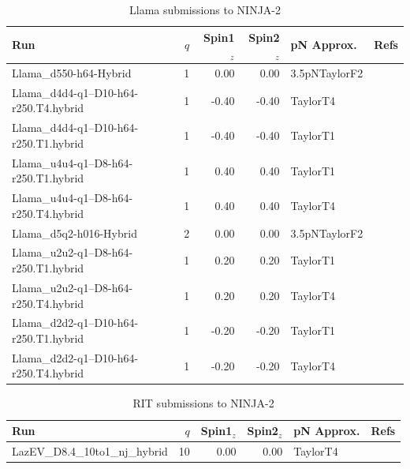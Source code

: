 \begin{table}
\begin{center}
\begin{tabular}{|l|r|r|r|l|c|}
\hline
Run & $q$ & Spin1${}_z$ & Spin2${}_z$ & pN Approx. & Refs \\
\hline
Llama\_d550-h64-Hybrid & 1 & 0.00 & 0.00 & 3.5pNTaylorF2 & \cite{Reisswig:2009rx,Reisswig:2009rx} \\
Llama\_d4d4-q1--D10-h64-r250.T4.hybrid & 1 & -0.40 & -0.40 & TaylorT4 & \cite{Pollney:2010hs,Pollney:2009yz} \\
Llama\_d4d4-q1--D10-h64-r250.T1.hybrid & 1 & -0.40 & -0.40 & TaylorT1 & \cite{Pollney:2010hs,Pollney:2009yz} \\
Llama\_u4u4-q1--D8-h64-r250.T1.hybrid & 1 & 0.40 & 0.40 & TaylorT1 & \cite{Pollney:2010hs,Pollney:2009yz} \\
Llama\_u4u4-q1--D8-h64-r250.T4.hybrid & 1 & 0.40 & 0.40 & TaylorT4 & \cite{Pollney:2010hs,Pollney:2009yz} \\
Llama\_d5q2-h016-Hybrid & 2 & 0.00 & 0.00 & 3.5pNTaylorF2 & \cite{Reisswig:2009rx} \\
Llama\_u2u2-q1--D8-h64-r250.T1.hybrid & 1 & 0.20 & 0.20 & TaylorT1 & \cite{Pollney:2010hs,Pollney:2009yz} \\
Llama\_u2u2-q1--D8-h64-r250.T4.hybrid & 1 & 0.20 & 0.20 & TaylorT4 & \cite{Pollney:2010hs,Pollney:2009yz} \\
Llama\_d2d2-q1--D10-h64-r250.T1.hybrid & 1 & -0.20 & -0.20 & TaylorT1 & \cite{Pollney:2010hs,Pollney:2009yz} \\
Llama\_d2d2-q1--D10-h64-r250.T4.hybrid & 1 & -0.20 & -0.20 & TaylorT4 & \cite{Pollney:2010hs,Pollney:2009yz} \\
\hline
\end{tabular}
\end{center}
\caption[Llama submissions to NINJA-2]{
\label{tab:ninja2_llama}
Llama submissions to NINJA-2}
\end{table}

\begin{table}
\begin{center}
\begin{tabular}{|l|r|r|r|l|c|}
\hline
Run & $q$ & Spin1${}_z$ & Spin2${}_z$ & pN Approx. & Refs \\
\hline
LazEV\_D8.4\_10to1\_nj\_hybrid & 10 & 0.00 & 0.00 & TaylorT4 & \cite{Campanelli:2005dd} \\
\hline
\end{tabular}
\end{center}
\caption[RIT submissions to NINJA-2]{
\label{tab:ninja2_rit}
RIT submissions to NINJA-2}
\end{table}

